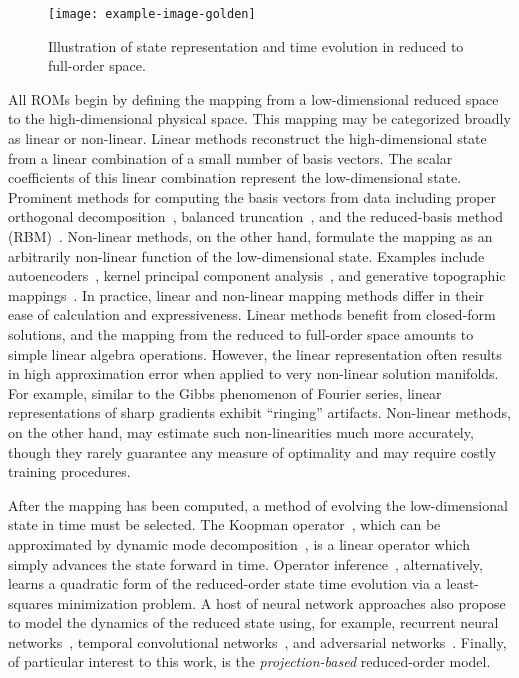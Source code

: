 \begin{figure}
	\centering
	\texttt{[image: example-image-golden]}
	\caption{\label{fig:mappingVis}Illustration of state representation and time evolution in reduced to full-order space.}
\end{figure}

All ROMs begin by defining the mapping from a low-dimensional reduced space to the high-dimensional physical space. This mapping may be categorized broadly as linear or non-linear. Linear methods reconstruct the high-dimensional state from a linear combination of a small number of basis vectors. The scalar coefficients of this linear combination represent the low-dimensional state. Prominent methods for computing the basis vectors from data including proper orthogonal decomposition~\cite{berkoozPOD}, balanced truncation~\cite{Gugercin2004}, and the reduced-basis method (RBM)~\cite{reducedBasisBook}. Non-linear methods, on the other hand, formulate the mapping as an arbitrarily non-linear function of the low-dimensional state. Examples include autoencoders~\cite{Kramer1991}, kernel principal component analysis~\cite{kernelPCA}, and generative topographic mappings~\cite{Bishop1997}. In practice, linear and non-linear mapping methods differ in their ease of calculation and expressiveness. Linear methods benefit from closed-form solutions, and the mapping from the reduced to full-order space amounts to simple linear algebra operations. However, the linear representation often results in high approximation error when applied to very non-linear solution manifolds. For example, similar to the Gibbs phenomenon of Fourier series, linear representations of sharp gradients exhibit ``ringing'' artifacts. Non-linear methods, on the other hand, may estimate such non-linearities much more accurately, though they rarely guarantee any measure of optimality and may require costly training procedures.

After the mapping has been computed, a method of evolving the low-dimensional state in time must be selected. The Koopman operator~\cite{Budisic2012}, which can be approximated by dynamic mode decomposition~\cite{Schmid2010}, is a linear operator which simply advances the state forward in time. Operator inference~\cite{Peherstorfer2016}, alternatively, learns a quadratic form of the reduced-order state time evolution via a least-squares minimization problem. A host of neural network approaches also propose to model the dynamics of the reduced state using, for example, recurrent neural networks~\cite{Gonzalez2018}, temporal convolutional networks~\cite{Xu2020}, and adversarial networks~\cite{QuilodranCasas2021}. Finally, of particular interest to this work, is the \textit{projection-based} reduced-order model.

